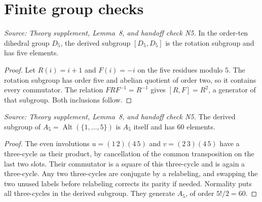 \section{Finite group checks}

\begin{lemma}
  \label{lem:n5-dihedral}
  \leanok
  \textit{Source: Theory supplement, Lemma~8, and handoff check N5.}
  In the order-ten dihedral group \(D_5\), the derived subgroup
  \([D_5,D_5]\) is the rotation subgroup and has five elements.
\end{lemma}
\begin{proof}
  \leanok
  Let \(R(i)=i+1\) and \(F(i)=-i\) on the five residues modulo \(5\).
  The rotation subgroup has order five and abelian quotient of order
  two, so it contains every commutator. The relation
  \(F R F^{-1}=R^{-1}\) gives \([R,F]=R^2\), a generator of that
  subgroup. Both inclusions follow.
\end{proof}

\begin{lemma}
  \label{lem:n5-alternating}
  \leanok
  \textit{Source: Theory supplement, Lemma~8, and handoff check N5.}
  The derived subgroup of \(A_5=\operatorname{Alt}(\{1,\ldots,5\})\)
  is \(A_5\) itself and has \(60\) elements.
\end{lemma}
\begin{proof}
  \leanok
  The even involutions \(u=(1\,2)(4\,5)\) and \(v=(2\,3)(4\,5)\)
  have a three-cycle as their product, by cancellation of the common
  transposition on the last two slots. Their commutator is a square
  of this three-cycle and is again a three-cycle. Any two three-cycles
  are conjugate by a relabeling, and swapping the two unused labels
  before relabeling corrects its parity if needed. Normality puts all
  three-cycles in the derived subgroup. They generate \(A_5\), of
  order \(5!/2=60\).
\end{proof}

